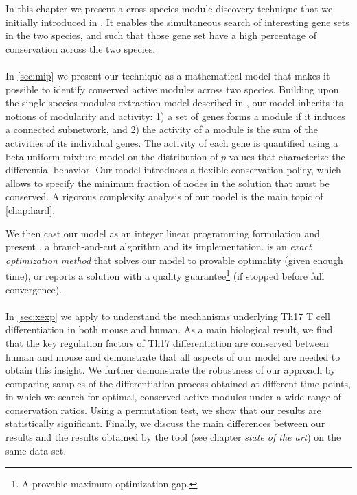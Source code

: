 In this chapter we present a cross-species module discovery technique that we initially introduced in \parencite{el2015xheinz}.
It enables the simultaneous search of interesting gene sets in the two species, and such that those gene set have a high percentage of conservation across the two species.

\paragraph{}
In \cref{sec:mip} we present our technique as a mathematical model that makes it possible to identify conserved active modules across two species.
Building upon the single-species modules extraction model described in \parencite{dittrich2008identifying}, our model inherits its notions of modularity and activity: 1) a set of genes forms a module if it induces a connected subnetwork, and 2) the activity of a module is the sum of the activities of its individual genes.
The activity of each gene is quantified using a beta-uniform mixture model on the distribution of $p$-values that characterize the differential behavior.
Our model introduces a flexible conservation policy, which allows to specify the minimum fraction of nodes in the solution that must be conserved.
A rigorous complexity analysis of our model is the main topic of \cref{chap:hard}.

We then cast our model as an integer linear programming formulation and present \xheinz{}, a branch-and-cut algorithm and its implementation.
\xheinz{} is an \emph{exact optimization method} that solves our model to provable optimality (given enough time), or reports a solution with a quality guarantee\footnote{A provable maximum optimization gap.} (if stopped before full convergence).

\paragraph{}
In \cref{sec:xexp} we apply \xheinz{} to understand the mechanisms underlying Th17 T cell differentiation in both mouse and human.
As a main biological result, we find that the key regulation factors of Th17 differentiation are conserved between human and mouse and demonstrate that all aspects of our model are needed to obtain this insight.
We further demonstrate the robustness of our approach by comparing samples of the differentiation process obtained at different time points, in which we search for optimal, conserved active modules under a wide range of conservation ratios.
Using a permutation test, we show that our results are statistically significant. Finally, we discuss the main differences between our results and the results obtained by the \nexus{} tool (see chapter \emph{state of the art}) on the same data set.

